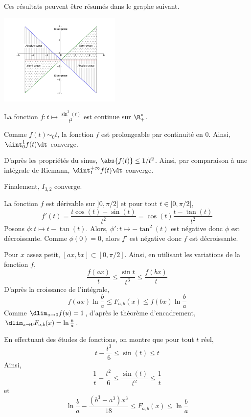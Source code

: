 \begin{solution}
Ces résultats peuvent être résumés dans le graphe suivant.
\begin{center}
\includegraphics[width=0.45\textwidth]{ensait-1996-domaines.png}
\end{center}

\qu La fonction $f : t \mapsto \frac{\sin^3(t)}{t^2}$ est continue sur $\R_+^*$.

 Comme $f(t) \sim_0 t$, la fonction $f$ est prolongeable par continuité en $0$. Ainsi, $\dint_0^1 f(t) \dt$ converge.

 D'après les propriétés du sinus, $\abs{f(t)} \leq 1/t^2$. Ainsi, par comparaison à une intégrale de Riemann, $\dint_1^{+\infty} f(t) \dt$ converge.

Finalement, $I_{3,2}$ converge.

\Qu La fonction $f$ est dérivable sur $]0,\pi/2]$ et pour tout $t \in ]0,\pi/2[$,
\[
f'(t) = \frac{t \cos(t) - \sin(t)}{t^2} = \cos(t) \frac{t - \tan(t)}{t^2}
\]
Posons $\phi : t \mapsto t - \tan(t)$. Alors, $\phi' : t \mapsto -\tan^2(t)$ est négative donc $\phi$ est décroissante. Comme $\phi(0) = 0$, alors $f'$ est négative donc $f$ est décroissante.

\squ Pour $x$ assez petit, $[a x, b x] \subset [0,\pi/2]$. Ainsi, en utilisant les variations de la fonction $f$,
\[
\frac{f(a x)}{t} \leq \frac{\sin t}{t^3} \leq \frac{f(b x)}{t}
\]
D'après la croissance de l'intégrale,
\[
f(a x) \ln \frac{b}{a} \leq F_{a,b}(x) \leq f(b x) \ln \frac{b}{a}
\]
Comme $\dlim_{u\to 0} f(u) = 1$, d'après le théorème d'encadrement, $\dlim_{x\to 0} F_{a,b}(x) = \ln \frac{b}{a}$.

 En effectuant des études de fonctions, on montre que pour tout $t$ réel,
\[
t - \frac{t^3}{6} \leq \sin(t) \leq t
\]
Ainsi,
\[
\frac{1}{t} - \frac{t^2}{6} \leq \frac{\sin(t)}{t^2} \leq \frac{1}{t}
\]
et
\[
\ln\frac{b}{a} - \frac{(b^3 - a^3) x^3}{18} \leq F_{a,b}(x) \leq \ln\frac{b}{a}
\]


\end{solution}

